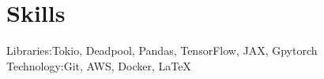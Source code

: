\documentclass[]{resume-openfont}
\begin{document}
\section{Skills}

\begin{skillList}
    {Libraries:}{Tokio, Deadpool, Pandas, TensorFlow, JAX, Gpytorch}
    \\
    {Technology:}{Git, AWS, Docker, \LaTeX}%
\end{skillList}
\end{document}
